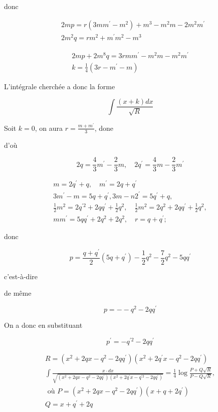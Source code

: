 \documentclass{article}
\begin{document}
donc

\[
\begin{aligned}
& 2 m p=r\left(3 m m^{\prime}-m^{2}\right)+m^{3}-m^{2} m-2 m^{2} m^{\prime} \\
& 2 m^{2} q=r m^{2}+m^{\prime} m^{2}-m^{3}
\end{aligned}
\]

\[
\begin{gathered}
2 m p+2 m^{8} q=3 r m m^{\prime}-m^{2} m-m^{2} m^{\prime} \\
k=\frac{1}{4}\left(3 r-m^{\prime}-m\right)
\end{gathered}
\]

L'intégrale cherchée a donc la forme

\[
\int \frac{(x+k) d x}{\sqrt{R}}
\]

Soit \(k=0\), on aura \(r=\frac{m+m^{\prime}}{3}\), done

d'où

\[
2 q=\frac{4}{3} m^{\prime}-\frac{2}{3} m, \quad 2 q^{\prime}=\frac{4}{3} m-\frac{2}{3} m^{\prime}
\]

\[
\begin{gathered}
m=2 q^{\prime}+q, \quad m^{\prime}=2 q+q^{\prime} \\
3 m^{\prime}-m=5 q+q^{\prime}, 3 m-n 2^{\prime}=5 q^{\prime}+q, \\
\frac{1}{2} m^{2}=2 q^{\prime 2}+2 q q^{\prime}+\frac{1}{2} q^{2}, \quad \frac{1}{2} m^{2}=2 q^{2}+2 q q^{\prime}+\frac{1}{2} q^{2}, \\
m m^{\prime}=5 q q^{\prime}+2 q^{2}+2 q^{2}, \quad r=q+q^{\prime} ;
\end{gathered}
\]

donc

\[
p=\frac{q+q^{\prime}}{2}\left(5 q+q^{\prime}\right)-\frac{1}{2} q^{2}-\frac{7}{2} q^{2}-5 q q^{\prime}
\]

c'est-à-dire

de même

\[
p=--q^{2}-2 q q^{\prime}
\]

On a donc en substituant

\[
p^{\prime}=-q^{\prime 2}-2 q q^{\prime}
\]

\[
\begin{gathered}
R=\left(x^{2}+2 q x-q^{2}-2 q q^{\prime}\right)\left(x^{2}+2 q^{\prime} x-q^{2}-2 q q^{\prime}\right) \\
\int \frac{x \cdot d x}{\sqrt{\left(x^{2}+2 q x-q^{2}-2 q q^{\prime}\right)\left(x^{2}+2 q^{\prime} x-q^{\prime 2}-2 q q^{\prime}\right)}}=\frac{1}{4} \log \frac{P+Q \sqrt{R}}{P-Q \sqrt{R}}, \\
\text { où } P=\left(x^{2}+2 q x-q^{2}-2 q q^{\prime}\right)\left(x+q+2 q^{\prime}\right) \\
Q=x+q^{\prime}+2 q
\end{gathered}
\]
\end{document}
